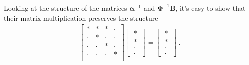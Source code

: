 \documentclass[letterpaper,10pt,english]{jupyterBook}
\begin{document}
\sphinxAtStartPar
Looking at the structure of the matrices \(\boldsymbol\alpha^{-1}\) and \(\boldsymbol\Phi^{-1} \mathbf{B}\), it’s easy to show that their matrix multiplication preserves the structure
\begin{equation*}
\begin{split}
\begin{bmatrix} 
  \ast  & \ast  & \ast  & \cdot \\
  \cdot & \ast  & \cdot & \cdot \\
  \cdot & \cdot & \ast  & \cdot \\
  \cdot & \cdot & \cdot & \ast  \\
\end{bmatrix} 
\begin{bmatrix} \ \ast \ \\ \ \ast \ \\ \ \cdot \ \\ \ \cdot \ \end{bmatrix} = 
\begin{bmatrix} \ \ast \ \\ \ \ast \ \\ \ \cdot \ \\ \ \cdot \ \end{bmatrix} \ .
\end{split}
\end{equation*}
\sphinxAtStartPar
{}
\end{document}
